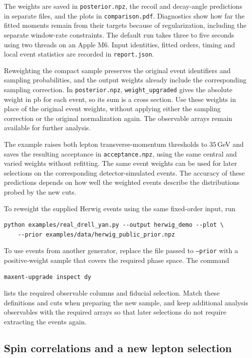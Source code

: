 The weights are saved in \texttt{posterior.npz}, the recoil and decay-angle predictions in separate files, and the plots in \texttt{comparison.pdf}. Diagnostics show how far the fitted moments remain from their targets because of regularization, including the separate window-rate constraints. The default run takes three to five seconds using two threads on an Apple M6. Input identities, fitted orders, timing and local event statistics are recorded in \texttt{report.json}.

Reweighting the compact sample preserves the original event identifiers and sampling probabilities, and the output weights already include the corresponding sampling correction. In \texttt{posterior.npz}, \texttt{weight\_upgraded} gives the absolute weight in pb for each event, so its sum is a cross section. Use these weights in place of the original event weights, without applying either the sampling correction or the original normalization again. The observable arrays remain available for further analysis.

The example raises both lepton transverse-momentum thresholds to $35\,$GeV and saves the resulting acceptance in \texttt{acceptance.npz}, using the same central and varied weights without refitting. The same event weights can be used for later selections on the corresponding detector-simulated events. The accuracy of these predictions depends on how well the weighted events describe the distributions probed by the new cuts.

To reweight the supplied Herwig events using the same fixed-order input, run
\begin{verbatim}
python examples/real_drell_yan.py --output herwig_demo --plot \
    --prior examples/data/herwig_public_prior.npz
\end{verbatim}
To use events from another generator, replace the file passed to \texttt{--prior} with a positive-weight sample that covers the required phase space. The command
\begin{verbatim}
maxent-upgrade inspect dy
\end{verbatim}
lists the required observable columns and fiducial selection. Match these definitions and cuts when preparing the new sample, and keep additional analysis observables with the required arrays so that later selections do not require extracting the events again.

\subsection{Spin correlations and a new lepton selection}

